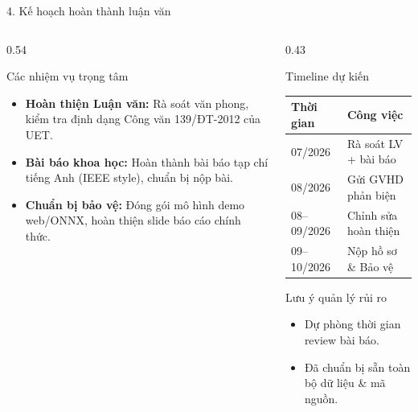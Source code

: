 \documentclass[aspectratio=169,11pt]{beamer}
\begin{document}
\begin{frame}{4. Kế hoạch hoàn thành luận văn}

\begin{columns}[T]
\begin{column}{0.54\textwidth}
\small

\begin{block}{Các nhiệm vụ trọng tâm}
\begin{itemize}\itemsep=3pt
    \item \textbf{Hoàn thiện Luận văn:} Rà soát văn phong, kiểm tra định dạng Công văn 139/ĐT-2012 của UET.
    \item \textbf{Bài báo khoa học:} Hoàn thành bài báo tạp chí tiếng Anh (IEEE style), chuẩn bị nộp bài.
    \item \textbf{Chuẩn bị bảo vệ:} Đóng gói mô hình demo web/ONNX, hoàn thiện slide báo cáo chính thức.
\end{itemize}
\end{block}

\end{column}
\begin{column}{0.43\textwidth}
\small

\begin{block}{Timeline dự kiến}
\centering
\scriptsize
\begin{tabular}{p{2.3cm}p{2.8cm}}
\toprule
\textbf{Thời gian} & \textbf{Công việc} \\
\midrule
07/2026 & Rà soát LV + bài báo \\
08/2026 & Gửi GVHD phản biện \\
08--09/2026 & Chỉnh sửa hoàn thiện \\
09--10/2026 & Nộp hồ sơ \& Bảo vệ \\
\bottomrule
\end{tabular}
\end{block}

\begin{alertblock}{\small Lưu ý quản lý rủi ro}
\scriptsize
\begin{itemize}
    \item Dự phòng thời gian review bài báo.
    \item Đã chuẩn bị sẵn toàn bộ dữ liệu \& mã nguồn.
\end{itemize}
\end{alertblock}

\end{column}
\end{columns}

\end{frame}
\end{document}
